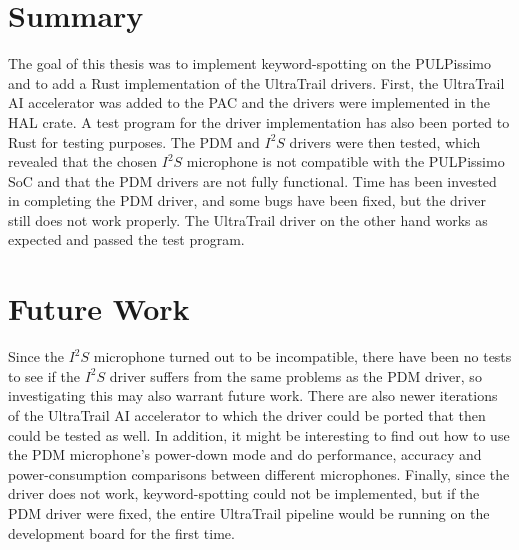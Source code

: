 
\section{Summary}

The goal of this thesis was to implement keyword-spotting on the PULPissimo and to add a Rust implementation of the UltraTrail drivers.
First, the UltraTrail AI accelerator was added to the PAC and the drivers were implemented in the HAL crate.
A test program for the driver implementation has also been ported to Rust for testing purposes.
The PDM and $I^2S$ drivers were then tested, which revealed that the chosen $I^2S$
microphone is not compatible with the PULPissimo SoC and that the PDM drivers are not fully functional.
Time has been invested in completing the PDM driver, and some bugs have been fixed, but the driver still does not work properly.
The UltraTrail driver on the other hand works as expected and passed the test program.

\section{Future Work}

Since the $I^2S$ microphone turned out to be incompatible, there have been no tests to see if the $I^2S$
driver suffers from the same problems as the PDM driver, so investigating this may also warrant future work.
There are also newer iterations of the UltraTrail AI accelerator to which the driver could be ported
that then could be tested as well.
In addition, it might be interesting to find out how to use the PDM microphone's power-down mode and
do performance, accuracy and power-consumption comparisons between different microphones.
Finally, since the driver does not work, keyword-spotting could not be implemented,
but if the PDM driver were fixed, the entire UltraTrail pipeline would be running on the development board for the first time.
